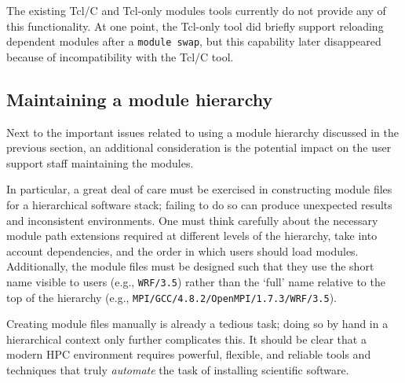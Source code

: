 The existing Tcl/C and Tcl-only modules tools currently do not provide any of this
functionality. At one point, the Tcl-only tool did briefly support reloading
dependent modules after a \texttt{\small module swap}, but this capability later
disappeared because of incompatibility with the Tcl/C tool.




\subsection{Maintaining a module hierarchy}
\label{sec:maintaining_a_hierarchy}

Next to the important issues related to using a module hierarchy discussed in the
previous section, an additional consideration is the potential impact on the user
support staff maintaining the modules.

In particular, a great deal of care must be exercised in constructing module files
for a hierarchical software stack; failing to do so can produce unexpected results
and inconsistent environments. One must think carefully about the necessary module
path extensions required at different levels of the hierarchy, take into account
dependencies, and the order in which users should load modules. Additionally, the
module files must be designed such that they use the short name visible to users
(e.g., \texttt{\small WRF/3.5}) rather than the `full' name relative to the top of
the hierarchy (e.g., \texttt{\small MPI/GCC/4.8.2/OpenMPI/1.7.3/WRF/3.5}).

Creating module files manually is already a tedious task; doing so by hand in a
hierarchical context only further complicates this. It should be clear that a modern 
HPC environment requires powerful, flexible, and reliable tools and techniques that
truly \emph{automate} the task of installing scientific software.

